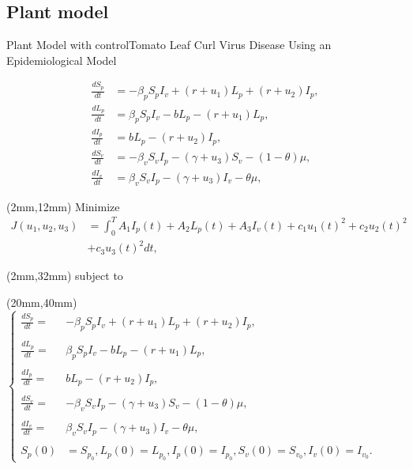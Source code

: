 \documentclass[10pt]{beamer}
\begin{document}
\subsection{Plant model}
\begin{frame}{Plant Model with control}{Tomato Leaf Curl Virus Disease Using an Epidemiological Model}

        \begin{align*}
            \frac{dS_p}{dt} &=-\beta_p S_p I_v +(r +u_1)L_p + (r + u_2) I_p,\\
            \frac{dL_p}{dt} &=\beta_p S_p I_v -b L_p -(r + u_1)L_p,\\
            \frac{dI_p}{dt} &= b L_p - (r + u_2) I_p,\\
            \frac{dS_v}{dt} &=-\beta_v S_v I_p - (\gamma+u_3) S_v -(1-\theta)\mu,\\
            \frac{dI_v}{dt} &=\beta_v S_v I_p -(\gamma+u_3) I_v -\theta\mu,				
        \end{align*}
\end{frame}


\begin{frame}
	\begin{textblock*}{120mm}(2mm,12mm)
		Minimize
		\begin{align*}
			J(u_1,u_2,u_3)&=\int_{0}^T	A_1 I_p(t) + A_2 L_p(t) + A_3 I_v(t)
			+ c_1 u_1(t)^2+ c_2 u_2(t)^2\\ &+ c_3 u_3(t)^2 dt,
		\end{align*}
	\end{textblock*}
	\begin{textblock*}{20mm}(2mm,32mm)
		subject to
	\end{textblock*}

	\begin{textblock*}{120mm}(20mm,40mm)
		\hspace{50mm}	$\left\{ \begin{array}{ll}
				\frac{dS_p}{dt} = &-\beta_p S_p I_v +(r +u_1)L_p + (r + u_2) I_p,\\\\
				\frac{dL_p}{dt} =&\beta_p S_p I_v -b L_p -(r + u_1)L_p,\\\\
				\frac{dI_p}{dt} =& b L_p - (r + u_2) I_p,\\\\
				\frac{dS_v}{dt} =&-\beta_v S_v I_p - (\gamma+u_3) S_v -(1-\theta)\mu,\\\\
				\frac{dI_v}{dt} =&\beta_v S_v I_p -(\gamma+u_3) I_v -\theta\mu,\\\\
				S_p(0) &= S_{p_0}, L_p(0) = L_{p_0},I_p(0) = I_{p_0},S_v(0) = S_{v_0}, I_v(0) = I_{v_0}.			
			\end{array}\right.$
	\end{textblock*}
\end{frame}
\end{document}
